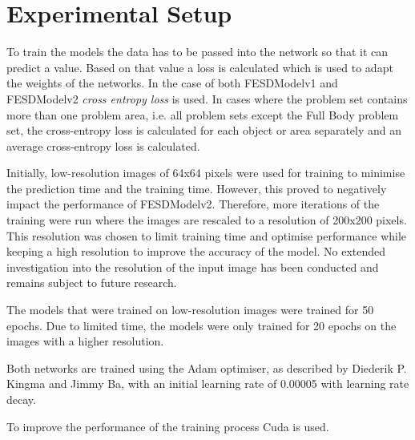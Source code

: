 \section{Experimental Setup}
\label{sec:model_training}

To train the models the data has to be passed into the network so that it can predict a value. Based on that value a loss is calculated which is used to adapt the weights of the networks. In the case of both FESDModelv1 and FESDModelv2 \textit{cross entropy loss} is used. In cases where the problem set contains more than one problem area, i.e. all problem sets except the Full Body problem set, the cross-entropy loss is calculated for each object or area separately and an average cross-entropy loss is calculated. 

Initially, low-resolution images of 64x64 pixels were used for training to minimise the prediction time and the training time. However, this proved to negatively impact the performance of FESDModelv2. Therefore, more iterations of the training were run where the images are rescaled to a resolution of 200x200 pixels. This resolution was chosen to limit training time and optimise performance while keeping a high resolution to improve the accuracy of the model. No extended investigation into the resolution of the input image has been conducted and remains subject to future research.

The models that were trained on low-resolution images were trained for 50 epochs. Due to limited time, the models were only trained for 20 epochs on the images with a higher resolution.

Both networks are trained using the Adam optimiser, as described by Diederik P. Kingma and Jimmy Ba\cite{kingma2017adam}, with an initial learning rate of 0.00005 with learning rate decay.

To improve the performance of the training process Cuda is used.